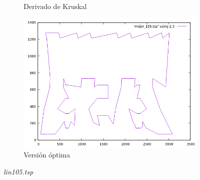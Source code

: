 \documentclass[12pt,spanish]{article}
\begin{document}
\begin{figure}[H]
\begin{subfigure}[b]{0.36\textwidth}
\caption{Derivado de Kruskal}
\end{subfigure}
\quad
\begin{subfigure}[b]{0.36\textwidth}
\includegraphics[width=\textwidth]{lin105_mejor.png}
\caption{Versión óptima}
\end{subfigure}
\caption{\textit{lin105.tsp}}
\end{figure}
\end{document}

